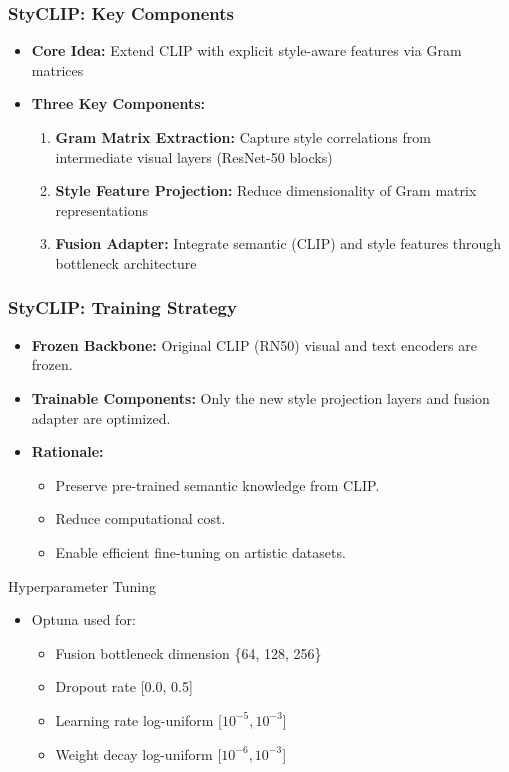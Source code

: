 \documentclass{beamer}
\begin{document}
\begin{frame}
  \frametitle{StyCLIP: Key Components}
  \begin{itemize}
    \item \textbf{Core Idea:} Extend CLIP with explicit style-aware features via Gram matrices
    \item \textbf{Three Key Components:}
      \begin{enumerate}
        \item \textbf{Gram Matrix Extraction:} Capture style correlations from intermediate visual layers (ResNet-50 blocks)
        \item \textbf{Style Feature Projection:} Reduce dimensionality of Gram matrix representations
        \item \textbf{Fusion Adapter:} Integrate semantic (CLIP) and style features through bottleneck architecture
      \end{enumerate}
  \end{itemize}
\end{frame}

\begin{frame}
  \frametitle{StyCLIP: Training Strategy}
  \begin{itemize}
    \item \textbf{Frozen Backbone:} Original CLIP (RN50) visual and text encoders are frozen.
    \item \textbf{Trainable Components:} Only the new style projection layers and fusion adapter are optimized.
    \item \textbf{Rationale:}
      \begin{itemize}
        \item Preserve pre-trained semantic knowledge from CLIP.
        \item Reduce computational cost.
        \item Enable efficient fine-tuning on artistic datasets.
      \end{itemize}
  \end{itemize}

  \begin{block}{Hyperparameter Tuning}
    \begin{itemize}
        \item Optuna \cite{Optuna} used for:
        \begin{itemize}
            \item Fusion bottleneck dimension \{64, 128, 256\}
            \item Dropout rate [0.0, 0.5]
            \item Learning rate log-uniform [$10^{-5}, 10^{-3}$]
            \item Weight decay log-uniform [$10^{-6}, 10^{-3}$]
        \end{itemize}
    \end{itemize}
  \end{block}
  \tiny \nocite{Optuna}
\end{frame}
\end{document}
